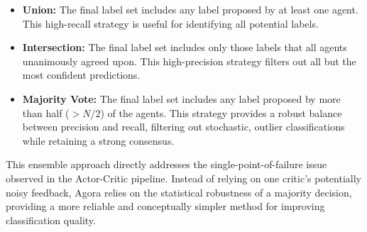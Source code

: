 \begin{itemize}
\item \textbf{Union:} The final label set includes any label proposed by at least one agent. This high-recall strategy is useful for identifying all potential labels.

\item \textbf{Intersection:} The final label set includes only those labels that all agents unanimously agreed upon. This high-precision strategy filters out all but the most confident predictions.

\item \textbf{Majority Vote:} The final label set includes any label proposed by more than half ($> N/2$) of the agents. This strategy provides a robust balance between precision and recall, filtering out stochastic, outlier classifications while retaining a strong consensus.
\end{itemize}

This ensemble approach directly addresses the single-point-of-failure issue observed in the Actor-Critic pipeline. Instead of relying on one critic's potentially noisy feedback, Agora relies on the statistical robustness of a majority decision, providing a more reliable and conceptually simpler method for improving classification quality.
